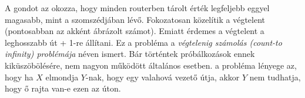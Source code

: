 \documentclass[fleqn,10pt,a4paper]{article}
\theoremstyle{magyar}
\begin{document}
  A gondot az okozza, hogy minden routerben tárolt érték legfeljebb eggyel magasabb, mint a szomszédjában
  lévő. Fokozatosan közelítik a végtelent (pontosabban az akként ábrázolt számot). Emiatt érdemes a végtelent a
  leghosszabb út + 1-re állítani. Ez a probléma a \emph{végtelenig számolás (count-to infinity) problémája} néven
  ismert. Bár történtek próbálkozások ennek kiküszöbölésére, nem nagyon működött általános esetben. a probléma lényege
  az, hogy ha $X$ elmondja $Y$-nak, hogy egy valahová vezető útja, akkor $Y$ nem tudhatja, hogy ő rajta van-e ezen az
  úton.
  
\end{document}
